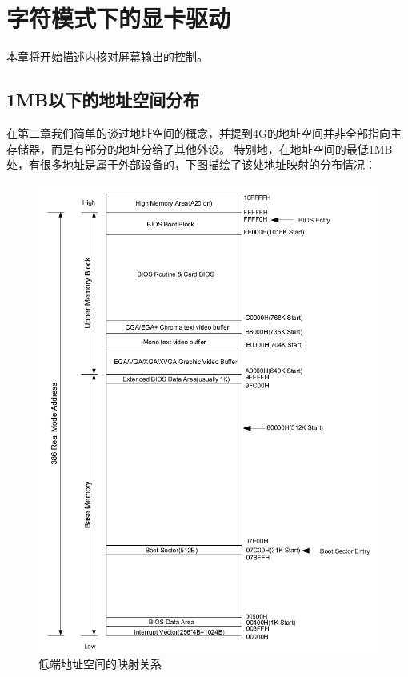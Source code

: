 
\section {字符模式下的显卡驱动}

\par 本章将开始描述内核对屏幕输出的控制。

\subsection{1MB以下的地址空间分布}

\par 在第二章我们简单的谈过地址空间的概念，并提到4G的地址空间并非全部指向主存储器，而是有部分的地址分给了其他外设。\allowbreak
特别地，在地址空间的最低1MB处，有很多地址是属于外部设备的，下图描绘了该处地址映射的分布情况：

\begin{figure}[H]
      \centering
      \includegraphics[scale=0.65]{picture/chapt4/BIOS-mem.png}
      \caption{低端地址空间的映射关系}
\end{figure}


